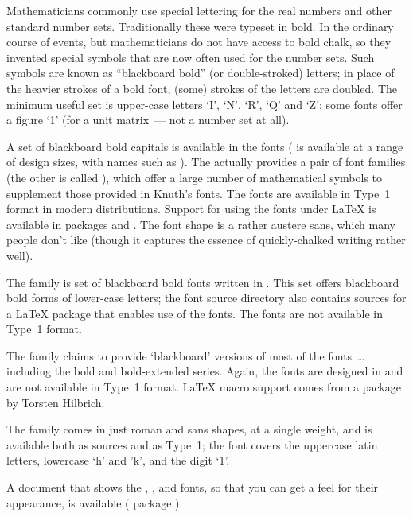 
Mathematicians commonly use special lettering for the real numbers and
other standard number sets. Traditionally these were typeset in bold.
In the ordinary course of events, but mathematicians do not have
access to bold chalk, so they invented special symbols that are now
often used for the number sets.  Such symbols are known as
``blackboard bold'' (or double-stroked) letters; in place of the heavier
strokes of a bold font, (some) strokes of the letters are doubled.
The minimum useful set is upper-case letters `I', `N', `R', `Q' and
`Z'; some fonts offer a figure `1' (for a unit matrix~--- not a number
set at all).

A set of blackboard bold capitals is available in the 
 fonts ( is available at a range of
design sizes, with names such as ).  The 
actually provides a pair of font
families (the other is called ), which offer a large number of
mathematical symbols to supplement those provided in Knuth's fonts.
The fonts are available in Type~1 format in
modern distributions.   Support for using the fonts under
\LaTeX{} is available in packages  and
.  The font shape is a rather
austere sans, which many people don't like (though it captures the
essence of quickly-chalked writing rather well).

The  family is set of blackboard bold fonts written in
\MF{}.  This set offers blackboard bold forms of lower-case letters;
the font source directory also contains sources for a \LaTeX{} package
that enables use of the fonts.  The fonts are not available in Type~1 format.

The  family claims to provide
`blackboard' versions of most of the  fonts~\dots{} including
the bold and bold-extended series.  Again, the fonts are designed in
\MF{} and are not available in Type~1 format.  \LaTeX{} macro support
comes from a package by Torsten Hilbrich.

The  family comes in just roman
and sans shapes, at a single weight, and is available both as \MF{}
sources and as Type~1; the font covers the uppercase latin letters,
lowercase `h' and 'k', and the digit `1'.

A document that shows the , ,
 and  fonts, so that you can get
a feel for their appearance, is available ( package
).


